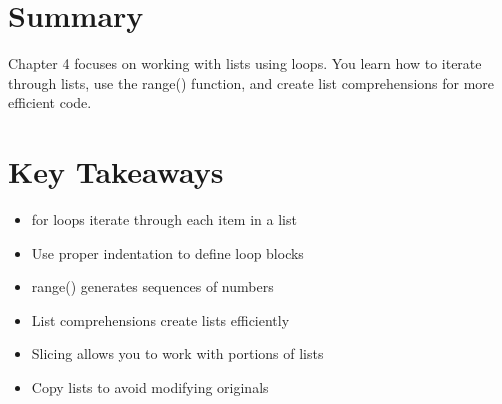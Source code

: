 \section*{Summary}
Chapter 4 focuses on working with lists using loops. You learn how to iterate through lists, use the range() function, and create list comprehensions for more efficient code.

\section*{Key Takeaways}
\begin{itemize}
    \item for loops iterate through each item in a list
    \item Use proper indentation to define loop blocks
    \item range() generates sequences of numbers
    \item List comprehensions create lists efficiently
    \item Slicing allows you to work with portions of lists
    \item Copy lists to avoid modifying originals
\end{itemize} 